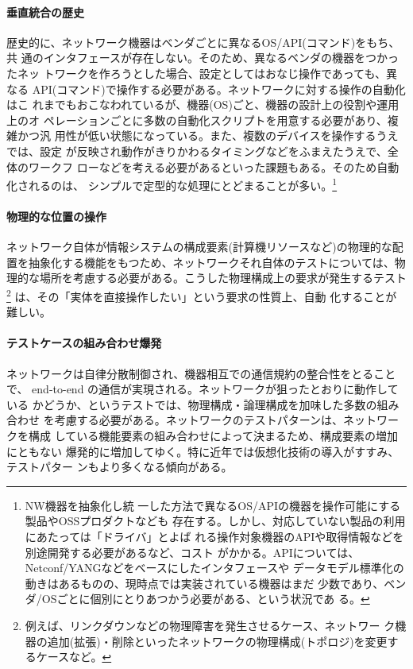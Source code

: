     \paragraph{垂直統合の歴史}
歴史的に、ネットワーク機器はベンダごとに異なるOS/API(コマンド)をもち、共
通のインタフェースが存在しない。そのため、異なるベンダの機器をつかったネッ
トワークを作ろうとした場合、設定としてはおなじ操作であっても、異なる
API(コマンド)で操作する必要がある。ネットワークに対する操作の自動化はこ
れまでもおこなわれているが、機器(OS)ごと、機器の設計上の役割や運用上のオ
ペレーションごとに多数の自動化スクリプトを用意する必要があり、複雑かつ汎
用性が低い状態になっている。また、複数のデバイスを操作するうえでは、設定
が反映され動作がきりかわるタイミングなどをふまえたうえで、全体のワークフ
ローなどを考える必要があるといった課題もある。そのため自動化されるのは、
シンプルで定型的な処理にとどまることが多い。\footnote{NW機器を抽象化し統
一した方法で異なるOS/APIの機器を操作可能にする製品やOSSプロダクトなども
存在する。しかし、対応していない製品の利用にあたっては「ドライバ」とよば
れる操作対象機器のAPIや取得情報などを別途開発する必要があるなど、コスト
がかかる。APIについては、Netconf/YANGなどをベースにしたインタフェースや
データモデル標準化の動きはあるものの、現時点では実装されている機器はまだ
少数であり、ベンダ/OSごとに個別にとりあつかう必要がある、という状況であ
る。}

    \paragraph{物理的な位置の操作}
ネットワーク自体が情報システムの構成要素(計算機リソースなど)の物理的な配
置を抽象化する機能をもつため、ネットワークそれ自体のテストについては、物
理的な場所を考慮する必要がある。こうした物理構成上の要求が発生するテスト
\footnote{例えば、リンクダウンなどの物理障害を発生させるケース、ネットワー
ク機器の追加(拡張)・削除といったネットワークの物理構成(トポロジ)を変更す
るケースなど。} は、その「実体を直接操作したい」という要求の性質上、自動
化することが難しい。

    \paragraph{テストケースの組み合わせ爆発}
ネットワークは自律分散制御され、機器相互での通信規約の整合性をとることで、
end-to-end の通信が実現される。ネットワークが狙ったとおりに動作している
かどうか、というテストでは、物理構成・論理構成を加味した多数の組み合わせ
を考慮する必要がある。ネットワークのテストパターンは、ネットワークを構成
している機能要素の組み合わせによって決まるため、構成要素の増加にともない
爆発的に増加してゆく。特に近年では仮想化技術の導入がすすみ、テストパター
ンもより多くなる傾向がある。

